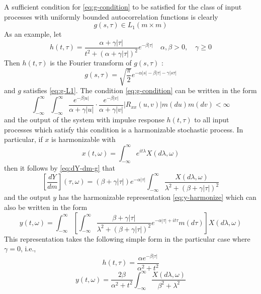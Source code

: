 \documentclass{article}
\begin{document}
A sufficient condition for \eqref{eq:g-condition} to be satisfied for the
class of input processes with uniformly bounded autocorrelation functions is
clearly
\begin{equation}
  g (s, \tau) \in L_1  (m \times m) \label{eq:g-L1}
\end{equation}
As an example, let
\begin{equation}
  h (t, \tau) = \frac{\alpha + \gamma | \tau |}{t^2 + (\alpha + \gamma | \tau
  |)^2} e^{- \beta | \tau |}  \quad \alpha, \beta > 0, \quad \gamma \geqslant
  0 \label{eq:h-example}
\end{equation}
Then $h (t, \tau)$ is the Fourier transform of $g (s, \tau)$ :
\begin{equation}
  g (s, \tau) = \sqrt{\frac{\pi}{2}} e^{- \alpha |s | - \beta | \tau | -
  \gamma |s \tau |} \label{eq:g-example}
\end{equation}
and $g$ satisfies \eqref{eq:g-L1}. The condition \eqref{eq:g-condition} can be
written in the form
\begin{equation}
  \int_{- \infty}^{\infty} \int_{- \infty}^{\infty} \frac{e^{- \beta
  |u|}}{\alpha + \gamma |u|} \cdot \frac{e^{- \beta |v|}}{\alpha + \gamma |v|}
  |R_{xx} (u, v) | m (du) m (dv) < \infty \label{eq:g-condition-example}
\end{equation}
and the output of the system with impulse response $h (t, \tau)$ to all input
processes which satisfy this condition is a harmonizable stochastic process.
In particular, if $x$ is harmonizable with
\begin{equation}
  x (t, \omega) = \int_{- \infty}^{\infty} e^{it \lambda} X (d \lambda,
  \omega) \label{eq:x-harmonize-example}
\end{equation}
then it follows by \eqref{eq:dY-dm-g} that
\begin{equation}
  \left[ \frac{dY}{dm} \right] (\tau, \omega) = (\beta + \gamma | \tau |) e^{-
  \alpha | \tau |}  \int_{- \infty}^{\infty} \frac{X (d \lambda,
  \omega)}{\lambda^2 + (\beta + \gamma | \tau |)^2} \label{eq:dY-dm-example}
\end{equation}
and the output $y$ has the harmonizable representation \eqref{eq:y-harmonize}
which can also be written in the form
\begin{equation}
  y (t, \omega) = \int_{- \infty}^{\infty} \left[ \int_{- \infty}^{\infty}
  \frac{\beta + \gamma | \tau |}{\lambda^2 + (\beta + \gamma | \tau |)^2} e^{-
  \alpha | \tau | + it \tau} m (d \tau) \right] X (d \lambda, \omega)
  \label{eq:y-full-example}
\end{equation}
This representation takes the following simple form in the particular case
where $\gamma = 0$, i.e.,
\begin{equation}
  h (t, \tau) = \frac{\alpha e^{- \beta | \tau |}}{\alpha^2 + t^2}
\end{equation}
\begin{equation}
  y (t, \omega) = \frac{2 \beta}{\alpha^2 + t^2}  \int_{- \infty}^{\infty}
  \frac{X (d \lambda, \omega)}{\beta^2 + \lambda^2}
  \label{eq:y-simple-example}
\end{equation}
\end{document}
